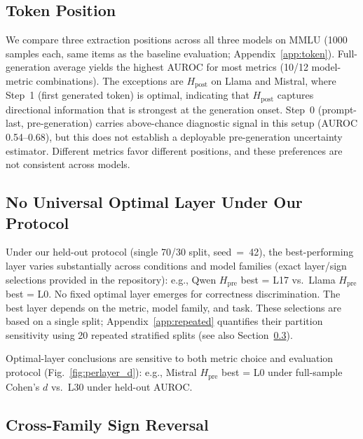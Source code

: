 \documentclass{ieeeaccess}
\newcommand{\Hpre}{H_{\text{pre}}}
\newcommand{\Hpost}{H_{\text{post}}}
\begin{document}
\subsection{Token Position}
\label{sec:token_position}

We compare three extraction positions across all three models on MMLU (1000 samples each, same items as the baseline evaluation; Appendix~\ref{app:token}). Full-generation average yields the highest AUROC for most metrics (10/12 model-metric combinations). The exceptions are $\Hpost$ on Llama and Mistral, where Step~1 (first generated token) is optimal, indicating that $\Hpost$ captures directional information that is strongest at the generation onset. Step~0 (prompt-last, pre-generation) carries above-chance diagnostic signal in this setup (AUROC 0.54--0.68), but this does not establish a deployable pre-generation uncertainty estimator. Different metrics favor different positions, and these preferences are not consistent across models.

\subsection{No Universal Optimal Layer Under Our Protocol}

Under our held-out protocol (single 70/30 split, seed~=~42), the best-performing layer varies substantially across conditions and model families (exact layer/sign selections provided in the repository): e.g., Qwen $\Hpre$ best = L17 vs.\ Llama $\Hpre$ best = L0. No fixed optimal layer emerges for correctness discrimination. The best layer depends on the metric, model family, and task. These selections are based on a single split; Appendix~\ref{app:repeated} quantifies their partition sensitivity using 20 repeated stratified splits (see also Section~\ref{sec:sign_reversal}).

Optimal-layer conclusions are sensitive to both metric choice and evaluation protocol (Fig.~\ref{fig:perlayer_d}): e.g., Mistral $\Hpre$ best = L0 under full-sample Cohen's $d$ vs.\ L30 under held-out AUROC.

\subsection{Cross-Family Sign Reversal}
\label{sec:sign_reversal}
\end{document}
